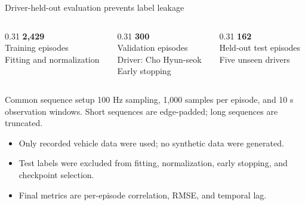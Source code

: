 \documentclass[aspectratio=169,11pt]{beamer}
\begin{document}
\begin{frame}{Driver-held-out evaluation prevents label leakage}
  \begin{columns}[T,onlytextwidth]
    \begin{column}{0.31\textwidth}
      \centering
      {\LARGE\bfseries 2,429}\\
      Training episodes\\[2mm]
      \small Fitting and normalization
    \end{column}
    \begin{column}{0.31\textwidth}
      \centering
      {\LARGE\bfseries 300}\\
      Validation episodes\\[2mm]
      \small Driver: Cho Hyun-seok\\
      Early stopping
    \end{column}
    \begin{column}{0.31\textwidth}
      \centering
      {\LARGE\bfseries 162}\\
      Held-out test episodes\\[2mm]
      \small Five unseen drivers
    \end{column}
  \end{columns}

  \vspace{0.6cm}
  \begin{block}{Common sequence setup}
    100 Hz sampling, 1,000 samples per episode, and 10 s observation windows.
    Short sequences are edge-padded; long sequences are truncated.
  \end{block}

  \begin{itemize}
    \item Only recorded vehicle data were used; no synthetic data were generated.
    \item Test labels were excluded from fitting, normalization, early stopping, and checkpoint selection.
    \item Final metrics are per-episode correlation, RMSE, and temporal lag.
  \end{itemize}
\end{frame}
\end{document}
